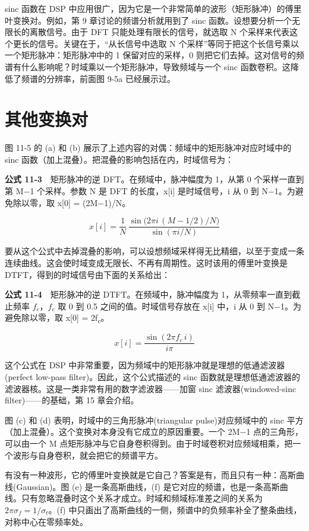 sinc 函数在 DSP
中应用很广，因为它是一个非常简单的波形（矩形脉冲）的傅里叶变换对。例如，第
9 章讨论的频谱分析就用到了 sinc
函数。设想要分析一个无限长的离散信号。由于 DFT
只能处理有限长的信号，就选取 N
个采样来代表这个更长的信号。关键在于，``从长信号中选取 N
个采样''等同于把这个长信号乘以一个矩形脉冲：矩形脉冲中的 1
保留对应的采样，0
则把它们去掉。这对信号的频谱有什么影响呢？时域乘以一个矩形脉冲，导致频域与一个
sinc 函数卷积。这降低了频谱的分辨率，前面图 9-5a 已经展示过。

\section{其他变换对}

图 11-5 的 (a) 和 (b) 展示了上述内容的对偶：频域中的矩形脉冲对应时域中的
sinc 函数（加上混叠）。把混叠的影响包括在内，时域信号为：

\textbf{公式 11-3}　矩形脉冲的逆 DFT。在频域中，脉冲幅度为 1，从第 0
个采样一直到第 M−1 个采样。参数 N 是 DFT 的长度，x{[}i{]} 是时域信号，i
从 0 到 N−1。为避免除以零，取 x{[}0{]} = (2M−1)/N。

\[x[i] = \frac{1}{N}\,\frac{\sin\!\big(2\pi i\,(M - 1/2)/N\big)}{\sin(\pi i / N)}\]

要从这个公式中去掉混叠的影响，可以设想频域采样得无比精细，以至于变成一条连续曲线。这会使时域变成无限长、不再有周期性。这时该用的傅里叶变换是
DTFT，得到的时域信号由下面的关系给出：

\textbf{公式 11-4}　矩形脉冲的逆 DTFT。在频域中，脉冲幅度为
1，从零频率一直到截止频率 \(f_c\)，\(f_c\) 取 0 到 0.5
之间的值。时域信号存放在 x{[}i{]} 中，i 从 0 到 N−1。为避免除以零，取
x{[}0{]} = 2f\textsubscript{c}。

\[x[i] = \frac{\sin(2\pi f_c\, i)}{i\pi}\]

这个公式在 DSP
中非常重要，因为频域中的矩形脉冲就是理想的低通滤波器(perfect low-pass
filter)。因此，这个公式描述的 sinc
函数就是理想低通滤波器的滤波器核。这是一类非常有用的数字滤波器------加窗
sinc 滤波器(windowed-sinc filter)------的基础，第 15 章会介绍。

图 (c) 和 (d) 表明，时域中的三角形脉冲(triangular pulse)对应频域中的
sinc 平方（加上混叠）。这个变换对本身没有它成立的原因重要。一个 2M−1
点的三角形，可以由一个 M
点矩形脉冲与它自身卷积得到。由于时域卷积对应频域相乘，把一个波形与自身卷积，就会把它的频谱平方。

有没有一种波形，它的傅里叶变换就是它自己？答案是有，而且只有一种：高斯曲线(Gaussian)。图
(e) 是一条高斯曲线，(f)
是它对应的频谱，也是一条高斯曲线。只有忽略混叠时这个关系才成立。时域和频域标准差之间的关系为
\(2\pi\sigma_f = 1/\sigma_t\)。(f)
中只画出了高斯曲线的一侧，频谱中的负频率补全了整条曲线，对称中心在零频率处。

